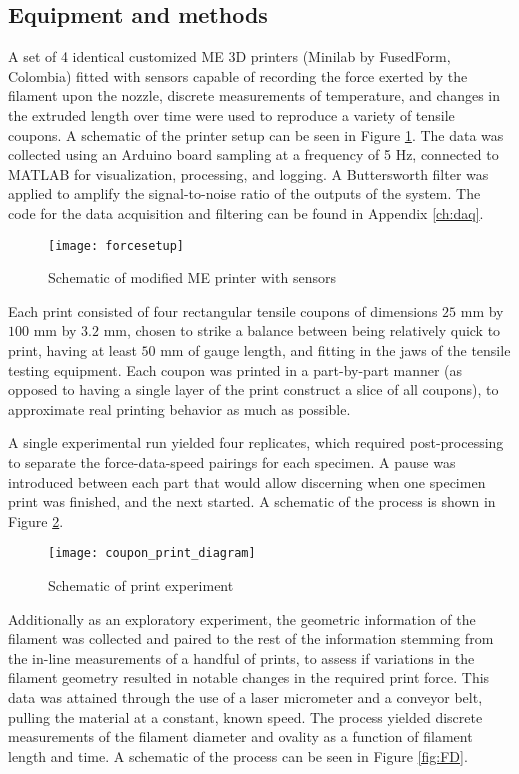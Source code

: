 \documentclass[main.tex]{subfiles}
\begin{document}
\subsection{Equipment and methods}\label{ssec:datag}

A set of 4 identical customized ME 3D printers (Minilab by FusedForm, Colombia) fitted with sensors capable of recording the force exerted by the filament upon the nozzle, discrete measurements of temperature, and changes in the extruded length over time were used to reproduce a variety of tensile coupons. A schematic of the printer setup can be seen in Figure 
\ref{fig:print_setup}. The data was collected using an Arduino board sampling at a frequency of 5 Hz, connected to MATLAB for visualization, processing, and logging. A Buttersworth filter was applied to amplify the signal-to-noise ratio of the outputs of the system. The code for the data acquisition and filtering can be found in Appendix \ref{ch:daq}.

\begin{figure}[!htbp]
	\center
	\texttt{[image: forcesetup]}
	\caption{Schematic of modified ME printer with sensors} \label{fig:print_setup}
\end{figure}

Each print consisted of four rectangular tensile coupons of dimensions $25 \text{ mm}$ by $100 \text{ mm}$ by $3.2 \text{ mm}$, chosen to strike a balance between being relatively quick to print, having at least $50\text{ mm}$ of gauge length, and fitting in the jaws of the tensile testing equipment. Each coupon was printed in a part-by-part manner (as opposed to having a single layer of the print construct a slice of all coupons), to approximate real printing behavior as much as possible. 

A single experimental run yielded four replicates, which required post-processing to separate the force-data-speed pairings for each specimen. A pause was introduced between each part that would allow discerning when one specimen print was finished, and the next started. A schematic of the process is shown in Figure \ref{fig:print_dia}. 


\begin{figure}[!htbp]
	\center
	\texttt{[image: coupon\_print\_diagram]}
	\caption{Schematic of print experiment} \label{fig:print_dia}
\end{figure}

Additionally as an exploratory experiment, the geometric information of the filament was collected and paired to the rest of the information stemming from the in-line measurements of a handful of prints, to assess if variations in the filament geometry resulted in notable changes in the required print force. This data was attained through the use of a laser micrometer and a conveyor belt, pulling the material at a constant, known speed. The process yielded discrete measurements of the filament diameter and ovality as a function of filament length and time. A schematic of the process can be seen in Figure \ref{fig:FD}.  
\end{document}
